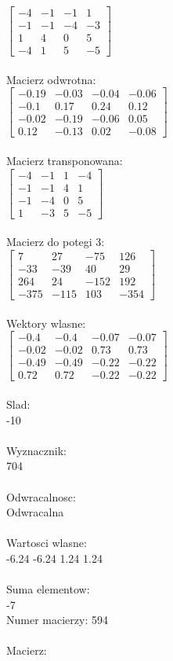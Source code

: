 \documentclass[a4paper,12pt]{article}
\begin{document}
$\begin{bmatrix} -4&-1&-1&1\\-1&-1&-4&-3\\1&4&0&5\\-4&1&5&-5 \end{bmatrix}$
\\
\\
Macierz odwrotna:\\

$\begin{bmatrix} -0.19&-0.03&-0.04&-0.06\\-0.1&0.17&0.24&0.12\\-0.02&-0.19&-0.06&0.05\\0.12&-0.13&0.02&-0.08 \end{bmatrix}$
\\
\\
Macierz transponowana:\\

$\begin{bmatrix} -4&-1&1&-4\\-1&-1&4&1\\-1&-4&0&5\\1&-3&5&-5 \end{bmatrix}$
\\
\\
Macierz do potegi 3:\\

$\begin{bmatrix} 7&27&-75&126\\-33&-39&40&29\\264&24&-152&192\\-375&-115&103&-354 \end{bmatrix}$
\\
\\
Wektory wlasne:\\

$\begin{bmatrix} -0.4&-0.4&-0.07&-0.07\\-0.02&-0.02&0.73&0.73\\-0.49&-0.49&-0.22&-0.22\\0.72&0.72&-0.22&-0.22 \end{bmatrix}$
\\
\\
Slad:\\
-10
\\
\\
Wyznacznik:\\
704
\\
\\
Odwracalnosc:\\
Odwracalna
\\
\\
Wartosci wlasne:\\
-6.24 -6.24 1.24 1.24
\\
\\
Suma elementow:\\
-7
\\
\newpage
Numer macierzy:
594
\\
\\
Macierz:\\
\end{document}
